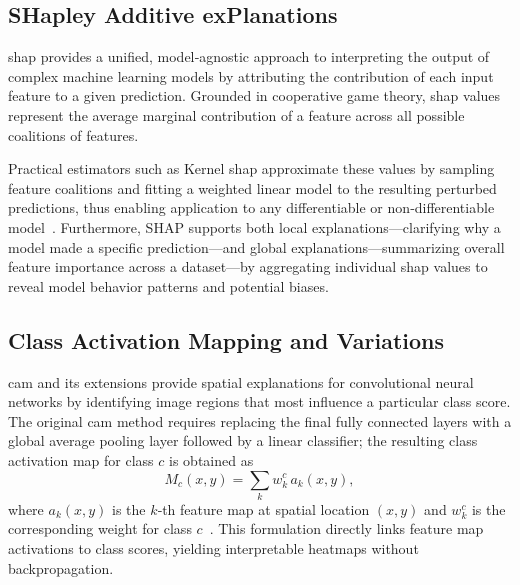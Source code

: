 \subsection{SHapley Additive exPlanations}
\acf{shap} provides a unified, model‐agnostic approach to interpreting the output of complex machine learning models by attributing the contribution of each input feature to a given prediction. Grounded in cooperative game theory, \ac{shap} values represent the average marginal contribution of a feature across all possible coalitions of features. 

Practical estimators such as Kernel \ac{shap} approximate these values by sampling feature coalitions and fitting a weighted linear model to the resulting perturbed predictions, thus enabling application to any differentiable or non‐differentiable model~\cite{lundberg_unified_2017}. Furthermore, SHAP supports both local explanations—clarifying why a model made a specific prediction—and global explanations—summarizing overall feature importance across a dataset—by aggregating individual \ac{shap} values to reveal model behavior patterns and potential biases.

\subsection{Class Activation Mapping and Variations}
\acf{cam} and its extensions provide spatial explanations for convolutional neural networks by identifying image regions that most influence a particular class score. The original \ac{cam} method requires replacing the final fully connected layers with a global average pooling layer followed by a linear classifier; the resulting class activation map for class \(c\) is obtained as
\[
M_c(x,y) = \sum_{k} w_k^c\,a_k(x,y),
\]
where \(a_k(x,y)\) is the \(k\)‑th feature map at spatial location \((x,y)\) and \(w_k^c\) is the corresponding weight for class \(c\)~\cite{zhou_learning_2016}. This formulation directly links feature map activations to class scores, yielding interpretable heatmaps without backpropagation.


